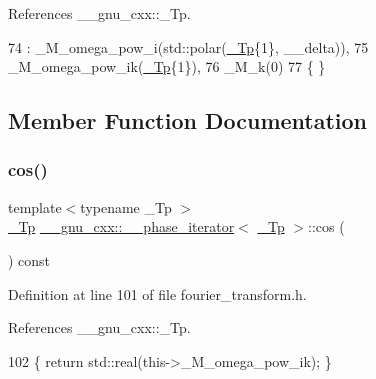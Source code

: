 References \+\_\+\+\_\+gnu\+\_\+cxx\+::\+\_\+\+Tp.


\begin{DoxyCode}
74       : \_M\_omega\_pow\_i(std::polar(\hyperlink{namespace____gnu__cxx_a3b19a9c800ca194374ef9172290f7d79}{\_Tp}\{1\}, \_\_delta)),
75         \_M\_omega\_pow\_ik(\hyperlink{namespace____gnu__cxx_a3b19a9c800ca194374ef9172290f7d79}{\_Tp}\{1\}),
76         \_M\_k(0)
77       \{ \}
\end{DoxyCode}


\subsection{Member Function Documentation}
\mbox{\label{class____gnu__cxx_1_1____phase__iterator_a4a6cbe9737e8073a586c35d355a89cca}} 
\subsubsection{\texorpdfstring{cos()}{cos()}}
{\footnotesize\ttfamily template$<$typename \+\_\+\+Tp $>$ \\
\hyperlink{namespace____gnu__cxx_a3b19a9c800ca194374ef9172290f7d79}{\+\_\+\+Tp} \hyperlink{class____gnu__cxx_1_1____phase__iterator}{\+\_\+\+\_\+gnu\+\_\+cxx\+::\+\_\+\+\_\+phase\+\_\+iterator}$<$ \hyperlink{namespace____gnu__cxx_a3b19a9c800ca194374ef9172290f7d79}{\+\_\+\+Tp} $>$\+::cos (\begin{DoxyParamCaption}{ }\end{DoxyParamCaption}) const\hspace{0.3cm}{\ttfamily [inline]}}



Definition at line 101 of file fourier\+\_\+transform.\+h.



References \+\_\+\+\_\+gnu\+\_\+cxx\+::\+\_\+\+Tp.


\begin{DoxyCode}
102       \{ \textcolor{keywordflow}{return} std::real(this->\_M\_omega\_pow\_ik); \}
\end{DoxyCode}
\mbox{\label{class____gnu__cxx_1_1____phase__iterator_ad66a70010229f4a0fe2cea225d59405e}} 
